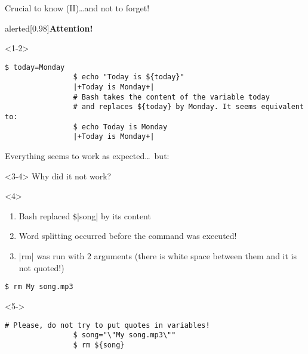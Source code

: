 \begin{frame}[fragile]{Crucial to know (II)}{\ldots{}and not to forget!}
    \begin{overlayarea}{\textwidth}{0.5\textheight}
        \vspace{-9mm}
        \begin{varblock}{alerted}[0.98\textwidth]{\textbf{Attention!}}
        \end{varblock}
        \begin{onlyenv}<1-2>
            \begin{lstlisting}[style=MyBash, belowskip=-4mm]
                $ today=Monday
                $ echo "Today is ${today}"
                |+Today is Monday+|
                # Bash takes the content of the variable today
                # and replaces ${today} by Monday. It seems equivalent to:
                $ echo Today is Monday
                |+Today is Monday+|
            \end{lstlisting}
            \centerline{Everything seems to work as expected\ldots\ but:}
        \end{onlyenv}
        \begin{onlyenv}<3-4>
            Why did it not work?
        \end{onlyenv}
        \begin{onlyenv}<4>
            \begin{enumerate}
                \item Bash replaced \texttt{\$}\bash|{song}| by its content
                \item Word splitting occurred before the command was executed!
                \item \bash|rm| was run with 2 arguments (there is white space between them and it is not quoted!)
            \end{enumerate}
            \begin{lstlisting}[style=MyBash, numbers=none]
                $ rm My song.mp3
            \end{lstlisting}
        \end{onlyenv}
        \begin{onlyenv}<5->
            \begin{lstlisting}[style=MyBash]
                # Please, do not try to put quotes in variables!
                $ song="\"My song.mp3\""
                $ rm ${song}

\end{lstlisting}
\end{onlyenv}
\end{overlayarea}
\end{frame}
